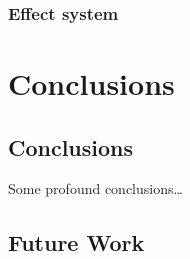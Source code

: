 \documentclass[12pt,phd,lfcs,twoside,openright,logo,leftchapter,normalheadings]{infthesis}
\theoremstyle{plain}
\theoremstyle{definition}
\begin{document}
\section{Effect system}

\part{Conclusions}

\chapter{Conclusions}
\label{ch:conclusions}
Some profound conclusions\dots

\chapter{Future Work}
\label{ch:future-work}


\singlespace



\end{document}
